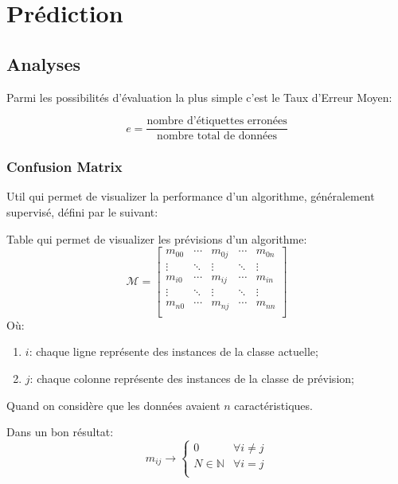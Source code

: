 \documentclass{article}
\begin{document}
\section{Prédiction}
\subsection{Analyses}
Parmi les possibilités d'évaluation la plus simple c'est le Taux d'Erreur Moyen:
\begin{definition}
    \begin{equation}
        \boxed{
            e = \frac{\text{nombre d'étiquettes erronées}}{\text{nombre total de données}}
        }
    \end{equation}
\end{definition}

\subsubsection{Confusion Matrix}
Util qui permet de visualizer la performance d'un algorithme, généralement supervisé, défini par le suivant:
\begin{definition}
    Table qui permet de visualizer les prévisions d'un algorithme:
    \begin{equation}
        \boxed{
            \mathcal{M} = 
            \begin{bmatrix}
                m_{00} & \cdots & m_{0j} & \cdots & m_{0n}\\
                \vdots & \ddots & \vdots & \ddots & \vdots\\
                m_{i0} & \cdots & m_{ij} & \cdots & m_{in}\\ 
                \vdots & \ddots & \vdots & \ddots & \vdots\\
                m_{n0} & \cdots & m_{nj} & \cdots & m_{nn}\\ 
            \end{bmatrix}
        }
    \end{equation}
    Où:
    \begin{enumerate}[noitemsep]
        \item $i$: chaque ligne représente des instances de la classe actuelle;
        \item $j$: chaque colonne représente des instances de la classe de prévision;
    \end{enumerate}
    Quand on considère que les données avaient $n$ caractéristiques.
    \begin{remark}
        Dans un bon résultat:
        \begin{equation*}
            m_{ij} \to 
            \begin{cases}
                0 & \forall i\neq j\\
                N\in\mathbb{N} & \forall i= j\\
            \end{cases}
        \end{equation*}
    \end{remark}
\end{definition}
\end{document}
